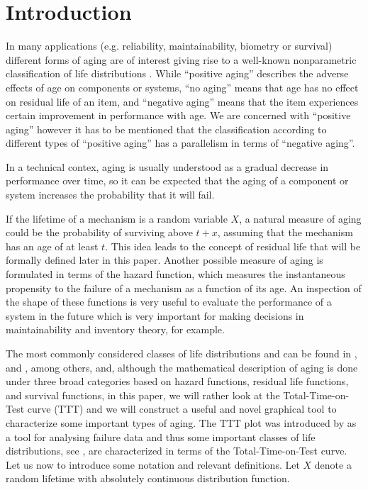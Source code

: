 \documentclass[preprint,12pt]{elsarticle}
\begin{document}
\linenumbers

\bigskip

\section{Introduction}
In many applications (e.g. reliability, maintainability, biometry or survival) different forms of aging are of interest giving rise to a well-known nonparametric classification of life distributions \cite{BP75}. While  ``positive aging'' describes the adverse effects of age on components or systems,  ``no aging'' means that age has no effect on residual life of an item, and  ``negative aging'' means that the item experiences certain improvement in performance with age. We are concerned with ``positive aging''  however it has to be mentioned that the classification according to different types of ``positive aging'' has a parallelism in terms of ``negative aging''. %

In a technical contex, aging is usually understood as a gradual decrease in performance over time, so it can be expected that the aging of a component or system increases the probability that it will fail. 

If the lifetime of a mechanism is a random variable $ X $, a natural measure of aging could be the probability of surviving above $ t + x $, assuming that the mechanism has an age of at least $ t $. This idea leads to the concept of residual life that will be formally defined later in this paper.
Another possible measure of aging is formulated in terms of the hazard function, which measures the  instantaneous propensity to the failure of a mechanism as a function of  its age. An inspection of the shape of these functions is very useful to evaluate the performance of a system in the future which is very important for making decisions in maintainability and inventory theory, for example. 

 The most commonly considered classes of life distributions and can be found in \cite{BP75}, \cite{DKS86} and \cite{CW91}, among others, and, although the mathematical description of aging is done under three broad categories based on hazard functions, residual life functions, and survival functions, in this paper, we will rather look at the Total-Time-on-Test curve (TTT) and we will construct a useful and novel graphical tool to characterize some important types of aging.  The TTT plot was introduced by \cite{BC75} as a tool for analysing failure data and thus some important classes of life distributions, see \cite{BK84}, are characterized in terms of the Total-Time-on-Test curve. Let us now to introduce some notation and relevant definitions. Let $X$ denote a random lifetime with absolutely continuous distribution function. 
\end{document}
